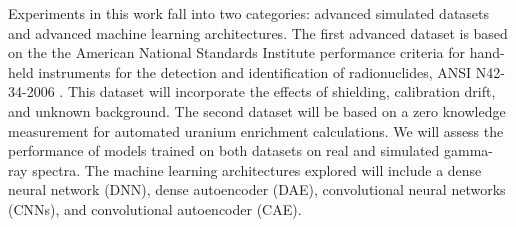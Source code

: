 Experiments in this work fall into two categories: advanced simulated datasets and advanced machine learning architectures. The first advanced dataset is based on the the American National Standards Institute performance criteria for hand-held instruments for the detection and identification of radionuclides, ANSI N42-34-2006 \cite{ANSI}. This dataset will incorporate the effects of shielding, calibration drift, and unknown background. The second dataset will be based on a zero knowledge measurement for automated uranium enrichment calculations. We will assess the performance of models trained on both datasets on real and simulated gamma-ray spectra. The machine learning architectures explored will include a dense neural network (DNN), dense autoencoder (DAE), convolutional neural networks (CNNs), and convolutional autoencoder (CAE).